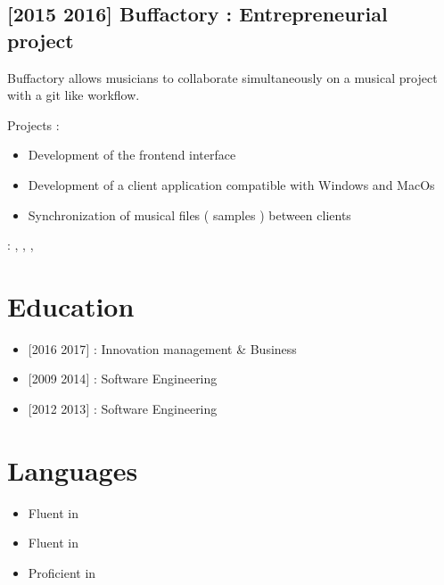 \documentclass[letterpaper,10pt,english]{sphinxmanual}
\begin{document}
\section{{[}2015 \sphinxhyphen{} 2016{]} Buffactory : Entrepreneurial project}
\label{\detokenize{index:buffactory-entrepreneurial-project}}
\sphinxAtStartPar
Buffactory allows musicians to collaborate simultaneously on a musical project with a git like workflow.

\sphinxAtStartPar
Projects :
\begin{itemize}
\item {} 
\sphinxAtStartPar
Development of the frontend interface

\item {} 
\sphinxAtStartPar
Development of a client application compatible with Windows and MacOs

\item {} 
\sphinxAtStartPar
Synchronization of musical files ( samples ) between clients

\end{itemize}

\sphinxAtStartPar
{} : , , , 


\chapter{Education}
\label{\detokenize{index:education}}\begin{itemize}
\item {} 
\sphinxAtStartPar
{[}2016 \sphinxhyphen{} 2017{]}  : Innovation management \& Business

\item {} 
\sphinxAtStartPar
{[}2009 \sphinxhyphen{} 2014{]}  : Software Engineering

\item {} 
\sphinxAtStartPar
{[}2012 \sphinxhyphen{} 2013{]}  : Software Engineering

\end{itemize}


\chapter{Languages}
\label{\detokenize{index:languages}}\begin{itemize}
\item {} 
\sphinxAtStartPar
Fluent in 

\item {} 
\sphinxAtStartPar
Fluent in 

\item {} 
\sphinxAtStartPar
Proficient in 

\end{itemize}
\end{document}
